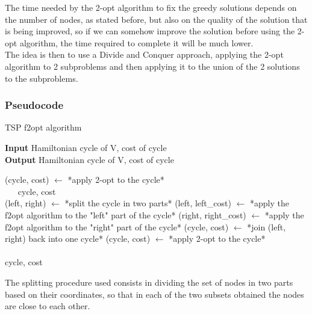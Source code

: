 The time needed by the 2-opt algorithm to fix the greedy solutions depends on the number of nodes, as stated before, but also on the quality of the solution that is being improved, so if we can somehow improve the solution before using the 2-opt algorithm, the time required to complete it will be much lower.\\

The idea is then to use a Divide and Conquer approach, applying the 2-opt algorithm to 2 subproblems and then applying it to the union of the 2 solutions to the subproblems.\\

\subsubsection{Pseudocode}
\begin{algorithm}
    \caption{TSP f2opt algorithm}

    \textbf{Input} Hamiltonian cycle of V, cost of cycle\\
    \textbf{Output} Hamiltonian cycle of V, cost of cycle\\
    \begin{algorithmic}

            \State (cycle, cost) $\gets$ *apply 2-opt to the cycle*\\
            $\quad\;\;$\Return cycle, cost
        \EndIf\\

            \State (left, right) $\gets$ *split the cycle in two parts*
            \State (left, left\_cost) $\gets$ *apply the f2opt algorithm to the "left" part of the cycle*
            \State (right, right\_cost) $\gets$ *apply the f2opt algorithm to the "right" part of the cycle*
            \State (cycle, cost) $\gets$ *join (left, right) back into one cycle*
            \State (cycle, cost) $\gets$ *apply 2-opt to the cycle*
        \EndWhile\\\\

        \Return cycle, cost

    \end{algorithmic}
\end{algorithm}

The splitting procedure used consists in dividing the set of nodes in two parts based on their coordinates, so that in each of the two subsets obtained the nodes are close to each other.

